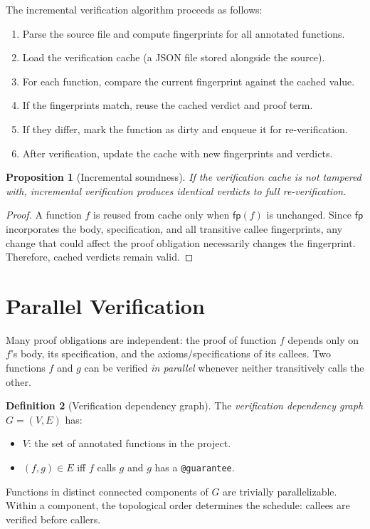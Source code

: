 \documentclass[11pt,a4paper]{report}
\theoremstyle{definition}
\newtheorem{definition}{Definition}[chapter]
\theoremstyle{plain}
\newtheorem{proposition}[definition]{Proposition}
\begin{document}
The incremental verification algorithm proceeds as follows:
\begin{enumerate}
  \item Parse the source file and compute fingerprints for all annotated
    functions.
  \item Load the verification cache (a JSON file stored alongside the source).
  \item For each function, compare the current fingerprint against the cached
    value.
  \item If the fingerprints match, reuse the cached verdict and proof term.
  \item If they differ, mark the function as dirty and enqueue it for
    re-verification.
  \item After verification, update the cache with new fingerprints and verdicts.
\end{enumerate}

\begin{proposition}[Incremental soundness]
If the verification cache is not tampered with, incremental verification
produces identical verdicts to full re-verification.
\end{proposition}
\begin{proof}
A function $f$ is reused from cache only when $\mathsf{fp}(f)$ is unchanged.
Since $\mathsf{fp}$ incorporates the body, specification, and all transitive
callee fingerprints, any change that could affect the proof obligation necessarily
changes the fingerprint.  Therefore, cached verdicts remain valid.
\end{proof}

\section{Parallel Verification}

Many proof obligations are independent: the proof of function $f$ depends only
on $f$'s body, its specification, and the axioms/specifications of its callees.
Two functions $f$ and $g$ can be verified \emph{in parallel} whenever neither
transitively calls the other.

\begin{definition}[Verification dependency graph]
The \emph{verification dependency graph} $G = (V, E)$ has:
\begin{itemize}
  \item $V$: the set of annotated functions in the project.
  \item $(f, g) \in E$ iff $f$ calls $g$ and $g$ has a \lstinline[style=synhopy]{@guarantee}.
\end{itemize}
Functions in distinct connected components of $G$ are trivially parallelizable.
Within a component, the topological order determines the schedule: callees
are verified before callers.
\end{definition}
\end{document}
